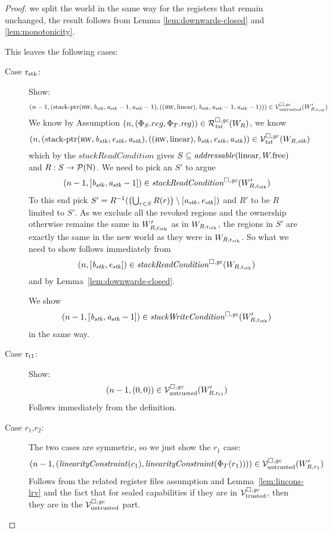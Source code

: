 \begin{proof}
  we split the world in the same way for the registers that remain unchanged, the
  result follows from Lemma \ref{lem:downwards-closed} and \ref{lem:monotonicity}.

  This leaves the following cases:
  \begin{description}
  \item[Case $\rstk$:] Show:
    \[
      \npair[n-1]{(\stkptr{\rw,\baddr_\stk,\aaddr_\stk-1,\aaddr_\stk-1},((\rw,\linear),\baddr_\stk,\aaddr_\stk-1,\aaddr_\stk-1))} \in \lrv(W_{R,\rstk}')
    \]
    We know by Assumption $\npair[n]{(\Phi_S.reg,\Phi_T.\reg)} \in \lrrg{\trust}(W_R)$, we know
    \[
      \npair[n]{(\stkptr{\rw,\baddr_\stk,\eaddr_\stk,\aaddr_\stk},((\rw, \linear), \baddr_\stk ,\eaddr_\stk, \aaddr_\stk)} \in \lrvg{\trust}(W_{R,\stk})
    \]
    which by the $\mathit{stackReadCondition}$ gives $S \subseteq \addressable{\linear,\pwfree}$ and $R : S \fun \powerset{\nats}$.
    We need to pick an $S'$ to argue
    \[
      \npair[n-1]{[\baddr_\stk,\aaddr_\stk-1]} \in \stackReadCond{W_{R,\rstk}'}
    \]
    To this end pick $S' = R^{-1}(\left(\bigcup_{r\in S} R(r) \right) \setminus [\aaddr_\stk,\eaddr_\stk])$ and $R'$ to be $R$ limited to $S'$.
    As we exclude all the revoked regions and the ownership otherwise remains the
    same in $W_{R,\rstk}'$ as in $W_{R,\rstk}$, the regions in $S'$ are exactly the same in the new world as they were in $W_{R,\rstk}$.
    So what we need to show follows immediately from
    \[
      \npair[n]{[\baddr_\stk,\eaddr_\stk]} \in \stackReadCond{W_{R,\rstk}}
    \]
    and by Lemma~\ref{lem:downwards-closed}.

    We show
    \[
      \npair[n-1]{[\baddr_\stk,\aaddr_\stk-1]} \in \stackWriteCond{W_{R,\rstk}'}
    \]
    in the same way.

  \item[Case $\rtmp{1}$:] Show:
    \[
      \npair[n-1]{(0,0)} \in \lrv(W_{R,\rtmp{1}}')
    \]
    Follows immediately from the definition.

  \item[Case $r_1$,$r_2$:] The two cases are symmetric, so we just show the $r_1$ case:
    \[
      \npair[n-1]{(\linCons{c_1},\linCons{\Phi_T(r_1)})} \in \lrv(W_{R,r_1}')
    \]
    Follows from the related register files assumption and Lemma~\ref{lem:lincons-lrv} and the fact that for sealed capabilities if they are in $\lrvg{\trusted}$, then they are in the $\lrv$ part.


\end{description}
\end{proof}
